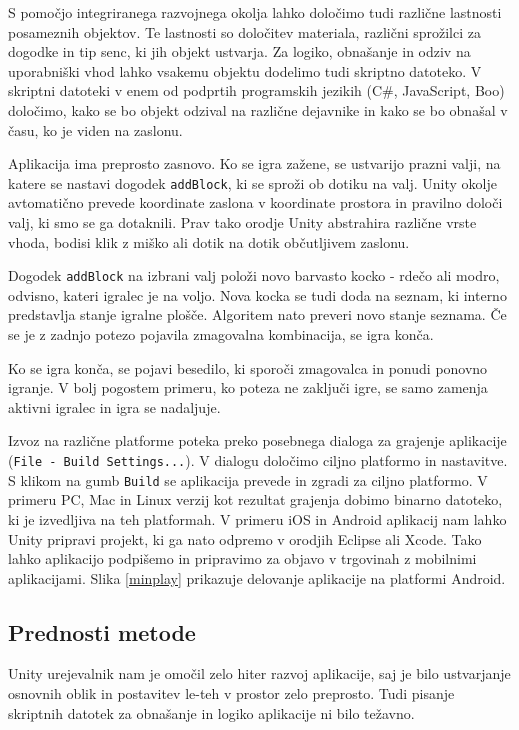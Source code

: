 S pomočjo integriranega razvojnega okolja lahko določimo tudi različne lastnosti posameznih objektov. Te lastnosti so določitev materiala, različni sprožilci za dogodke in tip senc, ki jih objekt ustvarja. Za logiko, obnašanje in odziv na uporabniški vhod lahko vsakemu objektu dodelimo tudi skriptno datoteko. V skriptni datoteki v enem od podprtih programskih jezikih (C\#, JavaScript, Boo) določimo, kako se bo objekt odzival na različne dejavnike in kako se bo obnašal v času, ko je viden na zaslonu.

Aplikacija ima preprosto zasnovo. Ko se igra zažene, se ustvarijo prazni valji, na katere se nastavi dogodek \texttt{addBlock}, ki se sproži ob dotiku na valj. Unity okolje avtomatično prevede koordinate zaslona v koordinate prostora in pravilno določi valj, ki smo se ga dotaknili. Prav tako orodje Unity abstrahira različne vrste vhoda, bodisi klik z miško ali dotik na dotik občutljivem zaslonu.

Dogodek \texttt{addBlock} na izbrani valj položi novo barvasto kocko - rdečo ali modro, odvisno, kateri igralec je na voljo. Nova kocka se tudi doda na seznam, ki interno predstavlja stanje igralne plošče. Algoritem nato preveri novo stanje seznama. Če se je z zadnjo potezo pojavila zmagovalna kombinacija, se igra konča.

Ko se igra konča, se pojavi besedilo, ki sporoči zmagovalca in ponudi ponovno igranje. V bolj pogostem primeru, ko poteza ne zaključi igre, se samo zamenja aktivni igralec in igra se nadaljuje. 

Izvoz na različne platforme poteka preko posebnega dialoga za grajenje aplikacije (\texttt{File - Build Settings...}). V dialogu določimo ciljno platformo in nastavitve. S klikom na gumb \texttt{Build} se aplikacija prevede in zgradi za ciljno platformo. V primeru PC, Mac in Linux verzij kot rezultat grajenja dobimo binarno datoteko, ki je izvedljiva na teh platformah. V primeru iOS in Android aplikacij nam lahko Unity pripravi projekt, ki ga nato odpremo v orodjih Eclipse ali Xcode. Tako lahko aplikacijo podpišemo in pripravimo za objavo v trgovinah z mobilnimi aplikacijami. Slika \ref{minplay} prikazuje delovanje aplikacije na platformi Android.

\subsection{Prednosti metode}

Unity urejevalnik nam je omočil zelo hiter razvoj aplikacije, saj je bilo ustvarjanje osnovnih oblik in postavitev le-teh v prostor zelo preprosto. Tudi pisanje skriptnih datotek za obnašanje in logiko aplikacije ni bilo težavno.

